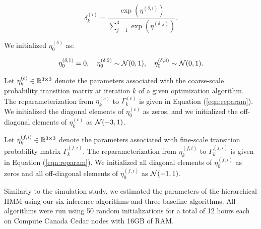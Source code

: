 \begin{equation}
    \delta_k^{(i)} = \frac{\exp(\eta^{(\delta,i)})}{\sum_{j=1}^{3} \exp(\eta^{(\delta,j)})}.
\end{equation}

We initialized $\eta^{(\delta)}_0$ as:

\begin{gather}
    \eta_0^{(\delta,1)} = 0, \quad  \eta_0^{(\delta,2)} \sim \mathcal{N}(0,1), \quad \eta_0^{(\delta,3)} \sim \mathcal{N}(0,1).
\end{gather}

Let $\eta_k^{(c)} \in \mathbb{R}^{3 \times 3}$ denote the parameters associated with the coarse-scale probability transition matrix at iteration $k$ of a given optimization algorithm. The reparameterization from $\eta_k^{(c)}$ to $\Gamma_k^{(c)}$ is given in Equation (\ref{eqn:reparam}). We initialized the diagonal elements of $\eta_0^{(c)}$ as zeros, and we initialized the off-diagonal elements of $\eta_k^{(c)}$ as $\mathcal{N}(-3,1)$.

Let $\eta_k^{(f,i)} \in \mathbb{R}^{3 \times 3}$ denote the parameters associated with fine-scale transition probability matrix $\Gamma_k^{(f,i)}$. The reparameterization from $\eta_k^{(f,i)}$ to $\Gamma_k^{(f,i)}$ is given in Equation (\ref{eqn:reparam}). We initialized all diagonal elements of $\eta_0^{(f,i)}$ as zeros and all off-diagonal elements of $\eta_0^{(f,i)}$ as $\mathcal{N}(-1,1)$.

%
%
Similarly to the simulation study, we estimated the parameters of the hierarchical HMM using our six inference algorithms and three baseline algorithms.
%
All algorithms were run using 50 random initializations for a total of 12 hours each on Compute Canada Cedar nodes with 16GB of RAM.

